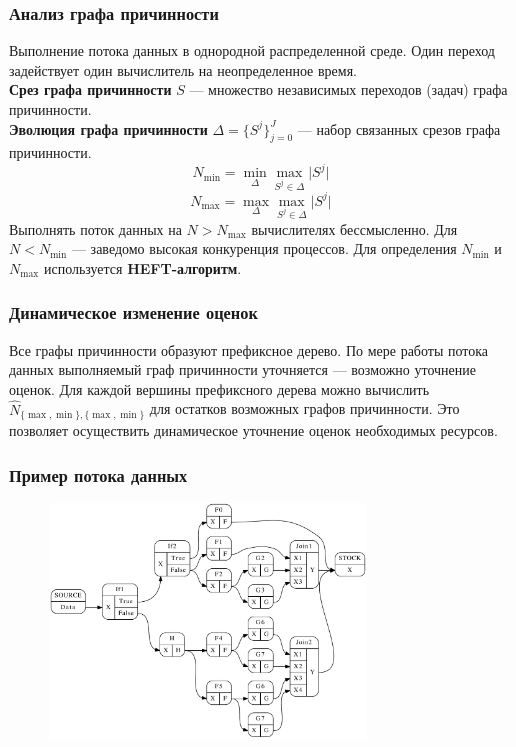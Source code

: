 \documentclass[10pt,pdf,hyperref={unicode}]{beamer}
\begin{document}
\begin{frame}
  \frametitle{Анализ графа причинности}
  Выполнение потока данных в однородной распределенной среде.
  Один переход задействует один вычислитель на неопределенное время.\\
  \textbf{Срез графа причинности} $S$ --- множество независимых переходов (задач) графа причинности.\\
  \textbf{Эволюция графа причинности} $\Delta = \{S^j\}^{J}_{j = 0}$ --- набор связанных срезов графа причинности.
  $$N_{\min} = \min_{\Delta} \max_{S^j \in \Delta} \lvert S^j \rvert$$
  $$N_{\max} = \max_{\Delta} \max_{S^j \in \Delta} \lvert S^j \rvert$$
  Выполнять поток данных на $N > N_{\max}$ вычислителях бессмысленно.
  Для $N < N_{\min}$ --- заведомо высокая конкуренция процессов.
  Для определения $N_{\min}$ и $N_{\max}$ используется \textbf{HEFT-алгоритм}.
\end{frame}

\begin{frame}
  \frametitle{Динамическое изменение оценок}
  Все графы причинности образуют префиксное дерево.
  По мере работы потока данных выполняемый граф причинности уточняется --- возможно уточнение оценок.
  Для каждой вершины префиксного дерева можно вычислить $\hat{N}_{\{\max, \min\}, \{\max, \min\}}$ для остатков возможных
  графов причинности.
  Это позволяет осуществить динамическое уточнение оценок необходимых ресурсов.
\end{frame}

\begin{frame}
  \frametitle{Пример потока данных}
  \begin{figure}[H]
    \centering
    \includegraphics[width=0.75\textwidth]{example2.pdf}
  \end{figure}
\end{frame}
\end{document}
